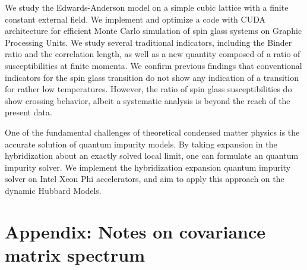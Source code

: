 \documentclass[edeposit,fullpage]{uiucthesis07}
\begin{document}
We study the Edwards-Anderson model on a simple cubic lattice with a finite 
constant external field. We implement and optimize a code with CUDA 
architecture for efficient Monte Carlo simulation of spin glass systems on 
Graphic Processing Units. 
We study several traditional indicators, including the Binder ratio and the 
correlation length, as well as a new quantity composed of 
a ratio of susceptibilities at finite momenta.%
We confirm previous findings that conventional indicators for the 
spin glass transition do not show any indication of a transition for rather 
low temperatures. 
However, the ratio of spin glass susceptibilities do show crossing behavior, 
albeit a systematic analysis is beyond the reach of the present data. 


One of the fundamental challenges of theoretical condensed matter physics is 
the accurate solution of quantum impurity models. By taking expansion in the 
hybridization about an exactly solved local limit, one can formulate an quantum
impurity solver. We implement the hybridization expansion quantum impurity
solver on Intel Xeon Phi accelerators, and aim to apply this approach on the
dynamic Hubbard Models.





\mainmatter





%
%

\backmatter


\appendix
\chapter*{Appendix: Notes on covariance matrix spectrum}

\end{document}
